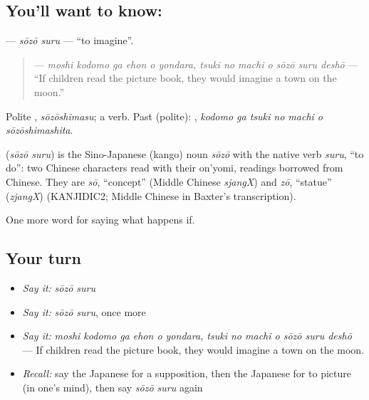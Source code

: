 \subsection*{You'll want to know: }
\textbf{} — \emph{sōzō suru} — \textquotedblleft{}to imagine\textquotedblright{}.

\begin{quote}
\textbf{     } — \emph{moshi kodomo ga ehon o yondara, tsuki no machi o sōzō suru deshō} — \textquotedblleft{}If children read the picture book, they would imagine a town on the moon.\textquotedblright{}
\end{quote}

Polite \textbf{}, \emph{sōzōshimasu}; a  verb. Past (polite): \textbf{   }, \emph{kodomo ga tsuki no machi o sōzōshimashita}.

\begin{cousinweb}
\textbf{} (\emph{sōzō suru}) is the Sino-Japanese (kango) noun \emph{sōzō} with the native verb \emph{suru}, \textquotedblleft{}to do\textquotedblright{}: two Chinese characters read with their on'yomi, readings borrowed from Chinese. They are \emph{sō}, \textquotedblleft{}concept\textquotedblright{} (Middle Chinese \emph{sjangX}) and \emph{zō}, \textquotedblleft{}statue\textquotedblright{} (\emph{zjangX}) (KANJIDIC2; Middle Chinese in Baxter's transcription).
\end{cousinweb}

\begin{grammarlens}[title={What you've built}]
One more word for saying what happens if.
\end{grammarlens}

\subsection*{Your turn}
\begin{itemize}
\raggedright
  \item \emph{Say it:} \emph{sōzō suru}
  \item \emph{Say it:} \emph{sōzō suru}, once more
  \item \emph{Say it:} \emph{moshi kodomo ga ehon o yondara, tsuki no machi o sōzō suru deshō} — If children read the picture book, they would imagine a town on the moon.
  \item \emph{Recall:} say the Japanese for a supposition, then the Japanese for to picture (in one's mind), then say \emph{sōzō suru} again
\end{itemize}


